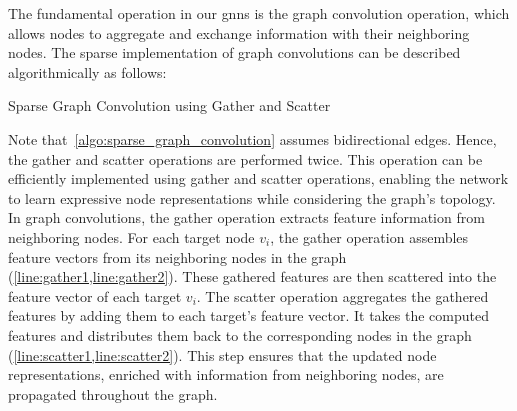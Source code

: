 The fundamental operation in our \acp{gnn} is the graph convolution operation, which allows nodes to aggregate and exchange information with their neighboring nodes.
The sparse implementation of graph convolutions can be described algorithmically as follows:
\begin{algorithm}[H]
    \caption{Sparse Graph Convolution using Gather and Scatter}\label{algo:sparse_graph_convolution}
    \begin{algorithmic}[1]
         \label{line:gather1}
         \label{line:gather2}
          \label{line:scatter1}
          \label{line:scatter2}
         \label{line:sum}
         \label{line:res}
        \EndFunction{}
    \end{algorithmic}
\end{algorithm}
Note that~\cref{algo:sparse_graph_convolution} assumes bidirectional edges.
Hence, the gather and scatter operations are performed twice.
This operation can be efficiently implemented using gather and scatter operations, enabling the network to learn expressive node representations while considering the graph's topology.
In graph convolutions, the gather operation extracts feature information from neighboring nodes.
For each target node $v_{i}$, the gather operation assembles feature vectors from its neighboring nodes in the graph (\cref{line:gather1,line:gather2}).
These gathered features are then scattered into the feature vector of each target $v_{i}$.
The scatter operation aggregates the gathered features by adding them to each target's feature vector.
It takes the computed features and distributes them back to the corresponding nodes in the graph (\cref{line:scatter1,line:scatter2}).
This step ensures that the updated node representations, enriched with information from neighboring nodes, are propagated throughout the graph.

